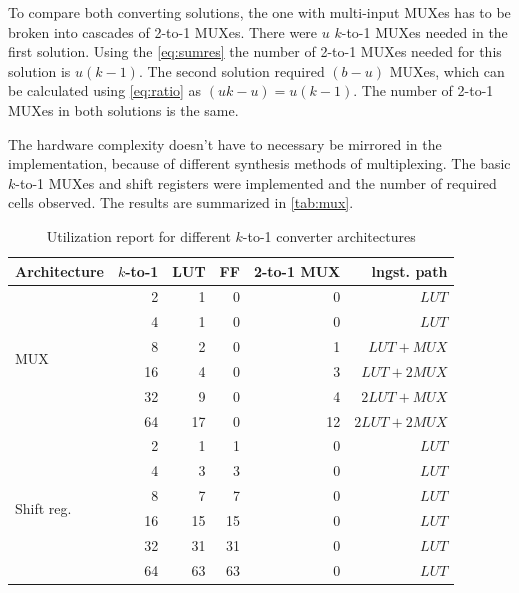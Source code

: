 To compare both converting solutions, the one with multi-input MUXes has to be broken into cascades of 2-to-1 MUXes. There were $u$ $k$-to-1 MUXes needed in the first solution. Using the \autoref{eq:sumres} the number of 2-to-1 MUXes needed for this solution is $u(k-1)$. The second solution required $(b-u)$ MUXes, which can be calculated using \autoref{eq:ratio} as $(uk-u)=u(k-1)$. The number of 2-to-1 MUXes in both solutions is the same.

The hardware complexity doesn't have to necessary be mirrored in the implementation, because of different synthesis methods of multiplexing. The basic $k$-to-1 MUXes and shift registers were implemented and the number of required cells observed. The results are summarized in \autoref{tab:mux}.

\begin{table}[h]
\begin{tabular}{@{}lrrrrr@{}}
\toprule
Architecture & $k$-to-1 & LUT & FF & 2-to-1 MUX & lngst. path \\
\midrule
\multirow{6}{*}{MUX} & 2 & 1 & 0 & 0 & $LUT$ \\ 
                & 4 & 1 & 0 & 0 & $LUT$ \\ 
                & 8 & 2 & 0 & 1 & $LUT+MUX$ \\ 
                &16 & 4 & 0 & 3 & $LUT+2MUX$ \\ 
                &32 & 9 & 0 & 4 & $2LUT+MUX$ \\ 
                &64 & 17 & 0 & 12 & $2LUT+2MUX$ \\ 
\midrule
\multirow{6}{*}{Shift reg.}  & 2 & 1 & 1 & 0 & $LUT$ \\ 
                        & 4 & 3 & 3 & 0 & $LUT$ \\ 
                        & 8 & 7 & 7 & 0 & $LUT$ \\ 
                        &16 & 15 & 15 & 0 &  $LUT$ \\ 
                        &32 & 31 & 31 & 0 &  $LUT$ \\ 
                        &64 & 63 & 63 & 0 &  $LUT$ \\ 
\bottomrule
\end{tabular}
\centering
\caption{Utilization report for different $k$-to-1 converter architectures} \label{tab:mux}
\end{table}

